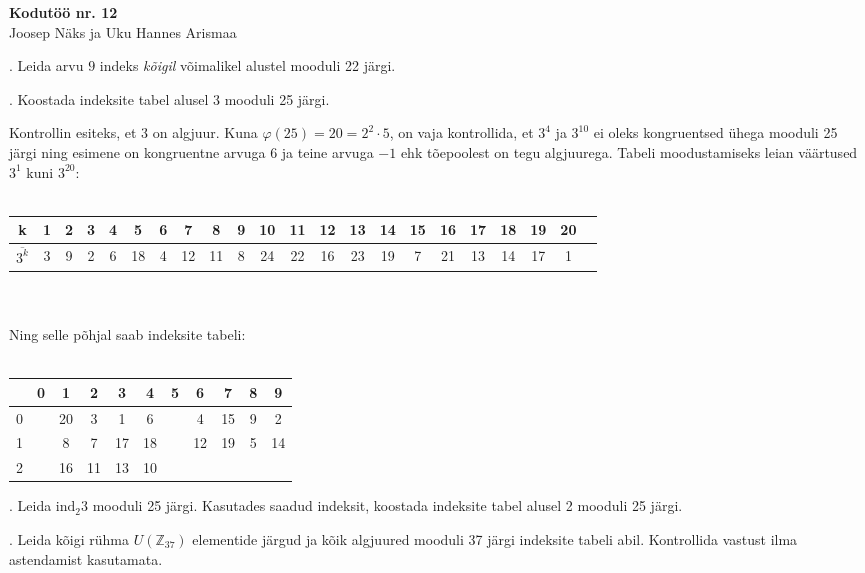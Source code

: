 \documentclass[a4paper, 10pt]{article}
\newcommand{\Z}{\mathbb{Z}}
\newcommand{\w}{\overline}
\begin{document}
\begin{center}
\Large\textbf{Kodutöö nr. 12}\\
\small{Joosep Näks ja Uku Hannes Arismaa}
\end{center}

\bigskip

\bigskip

. Leida arvu $9$ indeks \emph{kõigil} võimalikel alustel mooduli 22 järgi. 

\bigskip

. Koostada indeksite tabel alusel 3 mooduli 25 järgi. 

\bigskip
Kontrollin esiteks, et 3 on algjuur. Kuna $\varphi(25)=20=2^2\cdot5$, on vaja kontrollida, et $3^4$ ja $3^10$ ei oleks kongruentsed ühega mooduli 25 järgi ning esimene on kongruentne arvuga 6 ja teine arvuga $-1$ ehk tõepoolest on tegu algjuurega. Tabeli moodustamiseks leian väärtused $3^1$ kuni $3^{20}$:\\\\
\begin{tabular}{c|ccccccccccccccccccccc}
k&1&2&3&4&5&6&7&8&9&10&11&12&13&14&15&16&17&18&19&20\\
\hline
$\w{3^k}$&3&9&2&6&18&4&12&11&8&24&22&16&23&19&7&21&13&14&17&1
\end{tabular}\\\\
Ning selle põhjal saab indeksite tabeli:\\\\
\begin{tabular}{|c|cccccccccc|}
\hline
&0&1&2&3&4&5&6&7&8&9\\
\hline
0&&20&3&1&6&&4&15&9&2\\
1&&8&7&17&18&&12&19&5&14\\
2&&16&11&13&10&&&&&\\
\hline
\end{tabular}
\bigskip

. Leida  $\mathrm{ind}_{2}3$ mooduli 25 järgi. Kasutades saadud indeksit, koostada indeksite tabel alusel 2 mooduli 25 järgi.

\bigskip

. Leida kõigi rühma $U(\Z_{37})$ elementide järgud ja kõik algjuured mooduli 37 järgi indeksite tabeli abil. Kontrollida vastust ilma astendamist kasutamata. 
\end{document}
